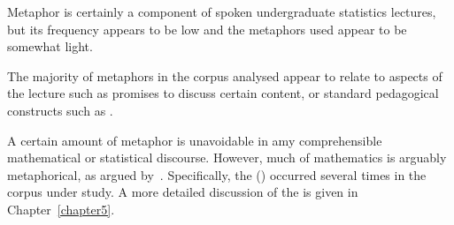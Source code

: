 Metaphor is certainly a component of spoken undergraduate statistics
lectures, but its frequency appears to be low and the metaphors used
appear to be somewhat light.

The majority of metaphors in the corpus analysed appear to relate to
 aspects of the lecture such as promises to discuss
certain content, or standard pedagogical constructs such as
.

A certain amount of metaphor is unavoidable in amy comprehensible
mathematical or statistical discourse.  However, much of mathematics
is arguably metaphorical, as argued by~.
Specifically, the  (\bmi)
occurred several times in the corpus under study.  A more detailed
discussion of the \bmi is given in Chapter~\ref{chapter5}.




%
%

%
